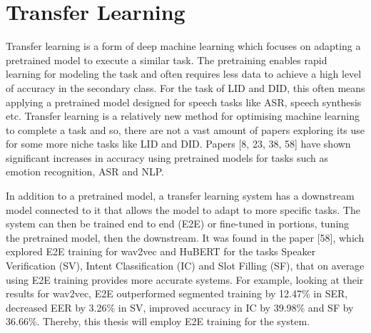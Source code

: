 \section{Transfer Learning}\label{sec:transfer}
Transfer learning is a form of deep machine learning which focuses on adapting a pretrained model to execute a 
similar task. The pretraining enables rapid learning for modeling the task and often requires less data to 
achieve a high level of accuracy in the secondary class. For the task of LID and DID, this often means applying 
a pretrained model designed for speech tasks like ASR, speech synthesis etc. Transfer learning is a relatively new method for optimising 
machine learning to complete a task and so, there are not a vast amount of papers exploring its use for some more niche tasks 
like LID and DID. Papers [8, 23, 38, 58] have shown significant increases in accuracy using pretrained models for tasks 
such as emotion recognition, ASR and NLP. 

In addition to a pretrained model, a transfer learning system has a downstream model connected to it that allows the model to 
adapt to more specific tasks. The system can then be trained end to end (E2E) or fine-tuned in portions, tuning the pretrained model, then 
the downstream. It was found in the paper [58], which explored E2E training for wav2vec and HuBERT for the tasks Speaker Verification (SV), Intent Classification (IC) and Slot Filling (SF), that on average using E2E training 
provides more accurate systems. For example, looking at their results for wav2vec, E2E outperformed segmented training by 12.47\% in SER, decreased EER by 3.26\% in SV, improved accuracy in IC by 39.98\% and SF by 36.66\%. 
Thereby, this thesis will employ E2E training for the system. 


